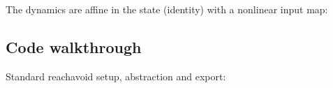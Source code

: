 \documentclass[a4paper,10pt,english]{sphinxmanual}
\begin{document}
\sphinxAtStartPar
The dynamics are affine in the state (identity) with a nonlinear input map:

\begin{sphinxVerbatim}[commandchars=\\\{\}]
\PYG{p}{[}\PYG{p}{]}
\PYG{p}{[}\PYG{p}{]}\PYG{p}{[}\PYG{p}{]}\PYG{p}{[}\PYG{p}{]}\PYG{p}{[}\PYG{p}{]}
\PYG{p}{[}\PYG{p}{]}\PYG{p}{[}\PYG{p}{]}\PYG{p}{[}\PYG{p}{]}\PYG{p}{[}\PYG{p}{]}
\end{sphinxVerbatim}


\subsection{Code walkthrough}
\label{\detokenize{benchmarks/PR_minimal:code-walkthrough}}
\sphinxAtStartPar
Standard reach\sphinxhyphen{}avoid setup, abstraction and export:
\end{document}
